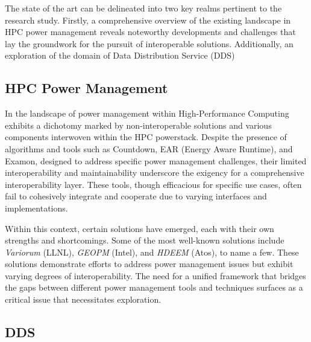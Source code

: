 The state of the art can be delineated into two key realms pertinent to the research study. Firstly, a comprehensive overview of the existing landscape in HPC power management reveals noteworthy developments and challenges that lay the groundwork for the pursuit of interoperable solutions. Additionally, an exploration of the domain of Data Distribution Service (DDS) %
\subsection{HPC Power Management}
In the landscape of power management within High-Performance Computing exhibits a dichotomy marked by non-interoperable solutions and various components interwoven within the HPC powerstack. Despite the presence of algorithms and tools such as Countdown, EAR (Energy Aware Runtime), and Examon, designed to address specific power management challenges, their limited interoperability and maintainability underscore the exigency for a comprehensive interoperability layer. These tools, though efficacious for specific use cases, often fail to cohesively integrate and cooperate due to varying interfaces and implementations.

Within this context, certain solutions have emerged, each with their own strengths and shortcomings. Some of the most well-known solutions include \emph{Variorum} (LLNL), \emph{GEOPM} (Intel), and \emph{HDEEM} (Atos), to name a few. These solutions demonstrate efforts to address power management issues but exhibit varying degrees of interoperability. The need for a unified framework that bridges the gaps between different power management tools and techniques surfaces as a critical issue that necessitates exploration.

\subsection{DDS}

